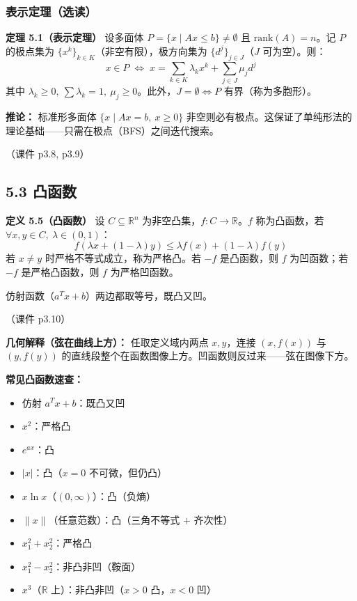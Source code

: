 \subsubsection{表示定理（选读）}

\textbf{定理 5.1（表示定理）}
设多面体 $P=\{x \mid Ax \le b\} \neq \emptyset$ 且 $\text{rank}(A)=n$。记 $P$ 的极点集为 $\{x^k\}_{k\in K}$（非空有限），极方向集为 $\{d^j\}_{j\in J}$（$J$ 可为空）。则：
\[
x \in P \;\Longleftrightarrow\; x = \sum_{k\in K}\lambda_k x^k + \sum_{j\in J}\mu_j d^j
\]
其中 $\lambda_k \ge 0,\ \sum\lambda_k = 1,\ \mu_j \ge 0$。此外，$J=\emptyset \Longleftrightarrow P$ 有界（称为多胞形）。

\textbf{推论：} 标准形多面体 $\{x \mid Ax=b,\ x\ge 0\}$ 非空则必有极点。这保证了单纯形法的理论基础——只需在极点（BFS）之间迭代搜索。

（课件 p3.8, p3.9）

\subsection{5.3 凸函数}

\textbf{定义 5.5（凸函数）}
设 $C \subseteq \mathbb{R}^n$ 为非空凸集，$f: C \to \mathbb{R}$。$f$ 称为凸函数，若 $\forall x,y\in C,\ \lambda\in(0,1)$：
\[
f(\lambda x + (1-\lambda) y) \le \lambda f(x) + (1-\lambda) f(y)
\]
若 $x\neq y$ 时严格不等式成立，称为严格凸。若 $-f$ 是凸函数，则 $f$ 为凹函数；若 $-f$ 是严格凸函数，则 $f$ 为严格凹函数。

仿射函数（$a^Tx+b$）两边都取等号，既凸又凹。

（课件 p3.10）

\textbf{几何解释（弦在曲线上方）：} 任取定义域内两点 $x,y$，连接 $(x,f(x))$ 与 $(y,f(y))$ 的直线段整个在函数图像上方。凹函数则反过来——弦在图像下方。

\textbf{常见凸函数速查：}
\begin{itemize}[leftmargin=*]
  \item 仿射 $a^T x+b$：既凸又凹
  \item $x^2$：严格凸
  \item $e^{ax}$：凸
  \item $|x|$：凸（$x=0$ 不可微，但仍凸）
  \item $x\ln x$（$(0,\infty)$）：凸（负熵）
  \item $\|x\|$（任意范数）：凸（三角不等式 $+$ 齐次性）
  \item $x_1^2+x_2^2$：严格凸
  \item $x_1^2-x_2^2$：非凸非凹（鞍面）
  \item $x^3$（$\mathbb{R}$ 上）：非凸非凹（$x>0$ 凸，$x<0$ 凹）
\end{itemize}

